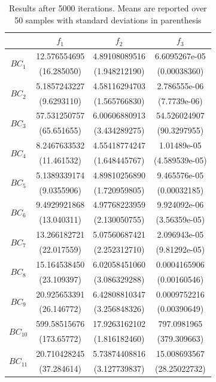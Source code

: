 \documentclass[conference]{IEEEtran}
\begin{document}
\begin{table}[htbp]
\caption{Results after 5000 iterations. Means are reported over 50 samples with standard deviations in parenthesis}
\begin{center}
\begin{tabular}{|c|c|c|c|}
\hline
& $ f_1 $ & $ f_2 $ & $ f_3 $\\\hline
\multirow{2}{*}{$ BC_1 $} &
12.576554695 & 4.89108089516 & 6.6095267e-05\\
&(16.285050) & (1.948212190) & (0.00038360)\\
\hline
\multirow{2}{*}{$ BC_2 $} &
5.1857243227 & 4.58116294703 & 2.786555e-06\\
&(9.6293110) & (1.565766830) & (7.7739e-06)\\
\hline
\multirow{2}{*}{$ BC_3 $} &
57.531250757 & 6.00606880913 & 54.526024907\\
&(65.651655) & (3.434289275) & (90.3297955)\\
\hline
\multirow{2}{*}{$ BC_4 $} &
8.2467633532 & 4.55418774247 & 1.01489e-05\\
&(11.461532) & (1.648445767) & (4.589539e-05)\\
\hline
\multirow{2}{*}{$ BC_5 $} &
5.1389339174 & 4.89810256890 & 9.465576e-05\\
&(9.0355906) & (1.720959805) & (0.00032185)\\
\hline
\multirow{2}{*}{$ BC_6 $} &
9.4929921868 & 4.97768223959 & 9.924092e-06\\
&(13.040311) & (2.130050755) & (3.56359e-05)\\
\hline
\multirow{2}{*}{$ BC_7 $} &
13.266182721 & 5.07560687421 & 2.096943e-05\\
&(22.017559) & (2.252312710) & (9.81292e-05)\\
\hline
\multirow{2}{*}{$ BC_8 $} &
15.164538450 & 6.02058451060 & 0.0004165906\\
&(23.109397) & (3.086329288) & (0.00160546)\\
\hline
\multirow{2}{*}{$ BC_9 $} &
20.925653391 & 6.42808810347 & 0.0009752216\\
&(26.146772) & (3.256848326) & (0.00390649)\\
\hline
\multirow{2}{*}{$ BC_10 $} &
599.58515676 & 17.9263162102 & 797.0981965\\
&(173.65772) & (1.816182460) & (379.309663) \\
\hline
\multirow{2}{*}{$ BC_11 $} &
20.710428245 & 5.73874408816 & 15.008693567\\
&(37.284614) & (3.127739837) & (28.25022732)\\

\end{tabular}
\end{center}
\end{table}
\end{document}
